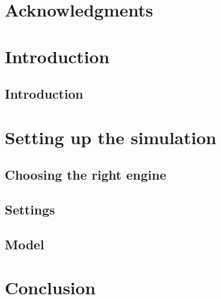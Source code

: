 \documentclass[12pt,a4paper, twoside]{report}
\begin{document}




\chapter*{Acknowledgments}


\tableofcontents

\listoffigures

\chapter{Introduction}
\section{Introduction}


\chapter{Setting up the simulation}

\section{Choosing the right engine}


\section{Settings}


\section{Model}


\chapter{Conclusion}


 
\end{document}
